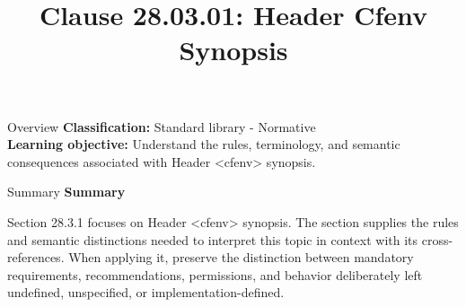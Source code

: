 \documentclass[10pt,letterpaper]{article}
\title{Clause 28.03.01: Header Cfenv Synopsis}
\author{}
\date{}
\begin{document}
\maketitle
\begin{CornellOverviewBox}{Overview}
\textbf{Classification:} Standard library - Normative\\[2pt]
\textbf{Learning objective:} Understand the rules, terminology, and semantic consequences associated with Header <cfenv> synopsis.
\end{CornellOverviewBox}\begin{CornellSummaryBox}{Summary}
{\sffamily\bfseries\color{Accent} Summary}\par\vspace{3pt}Section 28.3.1 focuses on Header <cfenv> synopsis. The section supplies the rules and semantic distinctions needed to interpret this topic in context with its cross-references. When applying it, preserve the distinction between mandatory requirements, recommendations, permissions, and behavior deliberately left undefined, unspecified, or implementation-defined.
\end{CornellSummaryBox}
\end{document}
